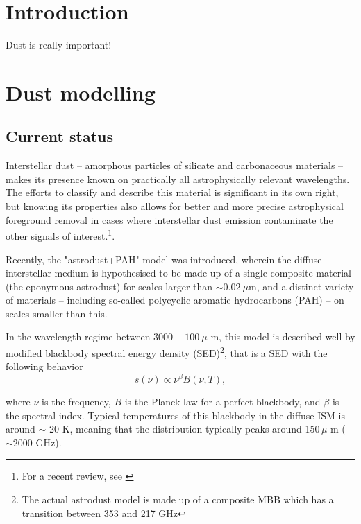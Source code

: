 \documentclass{aa}
\begin{document}
   \maketitle

\setcounter{tocdepth}{2}
\tableofcontents
   
\section{Introduction}
Dust is really important!

\clearpage
\section{Dust modelling}
\subsection{Current status}
\label{sec:current_dust}
Interstellar dust -- amorphous particles of silicate and carbonaceous materials
-- makes its presence known on practically all astrophysically relevant
wavelengths. The efforts to classify and describe this material is significant
in its own right, but knowing its properties also allows for better and more
precise astrophysical foreground removal in cases where interstellar dust
emission contaminate the other signals of interest.\footnote{For a recent
review, see \cite{Hensley2021}}.

Recently, the "astrodust+PAH" model \citep{Hensley2023} was introduced, wherein
the diffuse interstellar medium is hypothesised to be made up of a single
composite material (the eponymous astrodust) for scales larger than
$\sim0.02~\mu$m, and a distinct variety of materials -- including so-called
polycyclic aromatic hydrocarbons (PAH) -- on scales smaller than this.

In the wavelength regime between $3000-100~\mu$ m, this model is described well
 by modified blackbody spectral energy density (SED)\footnote{The actual
 astrodust model is made up of a composite MBB which has a transition between
353 and 217 GHz}, that is a SED with the following behavior
\begin{equation}
s(\nu) \propto \nu^\beta B(\nu, T),
\label{eq:mbb}
\end{equation}

where $\nu$ is the frequency, $B$ is the Planck law for a perfect blackbody,
and $\beta$ is the spectral index. Typical temperatures of this blackbody in
the diffuse ISM is around $\sim$ 20 K, meaning that the distribution typically
peaks around 150\,$\mu$ m ($\sim 2000$ GHz).
\end{document}
